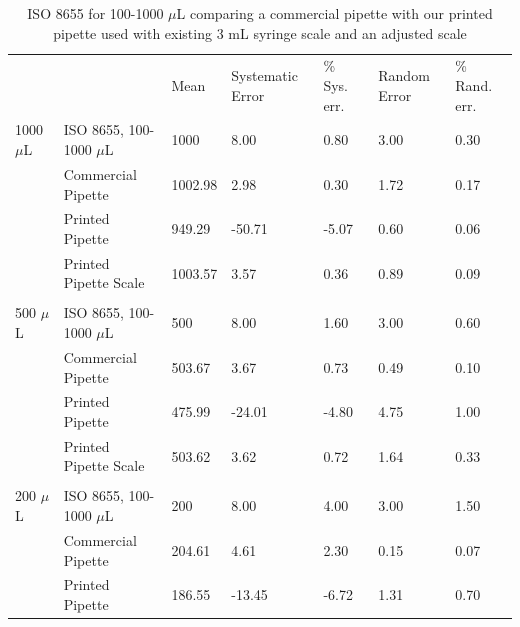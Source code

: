 \documentclass[10pt,letterpaper]{article}
\begin{document}
\begin{table}[!ht]
\begin{adjustwidth}{-2.25in}{0in} %
\centering
\caption{ISO 8655 for 100-1000 $\mu$L comparing a commercial pipette with our printed pipette used with existing 3 mL syringe scale and an adjusted scale}
\label{table3}
\begin{tabular}{lllllll}
        &                       & Mean   & Systematic Error & \% Sys. err. & Random Error & \% Rand. err. \\
1000 $\mu$L & ISO 8655, 100-1000 $\mu$L & 1000    & 8.00             & 0.80         & 3.00         & 0.30          \\
        & Commercial Pipette    & 1002.98 & 2.98             & 0.30         & 1.72         & 0.17          \\
        & Printed Pipette       & 949.29  & -50.71           & -5.07        & 0.60         & 0.06          \\
        & Printed Pipette Scale & 1003.57 & 3.57             & 0.36         & 0.89         & 0.09          \\
        &                       &         &                  &              &              &               \\
500 $\mu$L  & ISO 8655, 100-1000 $\mu$L & 500     & 8.00             & 1.60         & 3.00         & 0.60          \\
        & Commercial Pipette    & 503.67  & 3.67             & 0.73         & 0.49         & 0.10          \\
        & Printed Pipette       & 475.99  & -24.01           & -4.80        & 4.75         & 1.00          \\
        & Printed Pipette Scale & 503.62  & 3.62             & 0.72         & 1.64         & 0.33          \\
        &                       &         &                  &              &              &               \\
200 $\mu$L  & ISO 8655, 100-1000 $\mu$L & 200     & 8.00             & 4.00         & 3.00         & 1.50          \\
        & Commercial Pipette    & 204.61  & 4.61             & 2.30         & 0.15         & 0.07          \\
        & Printed Pipette       & 186.55  & -13.45           & -6.72        & 1.31         & 0.70          \\

\end{tabular}
\end{adjustwidth}
\end{table}
\end{document}
